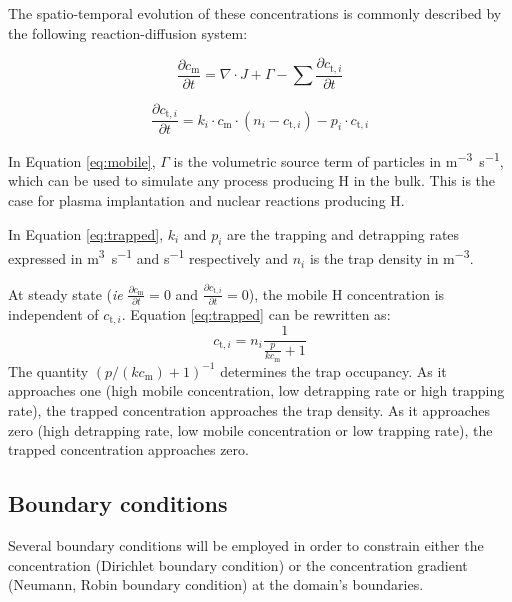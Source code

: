 The spatio-temporal evolution of these concentrations is commonly described by the following reaction-diffusion system:

\begin{equation}
    \frac{\partial c_\mathrm{m}}{\partial t}=\nabla \cdot J+\Gamma-\sum \frac{\partial c_{\mathrm{t}, i}}{\partial t}
    \label{eq:mobile}
\end{equation}

\begin{equation}
    \frac{\partial c_{\mathrm{t}, i}}{\partial t}=k_i \cdot c_\mathrm{m} \cdot\left(n_{i}-c_{\mathrm{t}, i}\right)-p_i \cdot c_{\mathrm{t}, i}
    \label{eq:trapped}
\end{equation}

In Equation \ref{eq:mobile}, $\Gamma$ is the volumetric source term of particles in \si{m^{-3}.s^{-1}}, which can be used to simulate any process producing H in the bulk.
This is the case for plasma implantation and nuclear reactions producing H.

In Equation \ref{eq:trapped}, $k_i$ and $p_i$ are the trapping and detrapping rates expressed in \si{m^3.s^{-1}} and \si{s^{-1}} respectively and $n_i$ is the trap density in \si{m^{-3}}.

At steady state (\textit{ie} $\frac{\partial c_\mathrm{m}}{\partial t} = 0$ and $\frac{\partial c_{\mathrm{t}, i}}{\partial t} = 0$), the mobile H concentration is independent of $c_{\mathrm{t}, i}$.
Equation \ref{eq:trapped} can be rewritten as:
\begin{equation}
    c_{\mathrm{t}, i} = n_i \frac{1}{\frac{p}{k c_\mathrm{m}} + 1}
    \label{eq: steady state ct}
\end{equation}
The quantity $(p / (k c_\mathrm{m}) + 1)^{-1}$ determines the trap occupancy. 
As it approaches one (high mobile concentration, low detrapping rate or high trapping rate), the trapped concentration approaches the trap density.
As it approaches zero (high detrapping rate, low mobile concentration or low trapping rate), the trapped concentration approaches zero.

\subsection{Boundary conditions}

Several boundary conditions will be employed in order to constrain either the concentration (Dirichlet boundary condition) or the concentration gradient (Neumann, Robin boundary condition) at the domain's boundaries.


